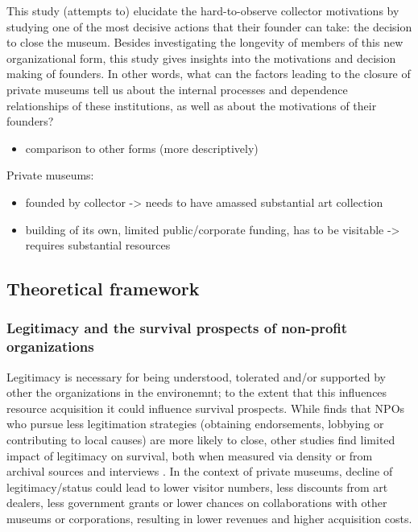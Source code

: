 \documentclass[11pt]{article}
\begin{document}
This study (attempts to) elucidate the hard-to-observe collector motivations by studying one of the most decisive actions that their founder can take: the decision to close the museum.
Besides investigating the longevity of members of this new organizational form, this study gives insights into the motivations and decision making of founders.
In other words, what can the factors leading to the closure of private museums tell us about the internal processes and dependence relationships of these institutions, as well as about the motivations of their founders?


\begin{itemize}
\item comparison to other forms (more descriptively)
\end{itemize}


\bigbreak
\noindent
Private museums:
\begin{itemize}
\item founded by collector -> needs to have amassed substantial art collection
\item building of its own, limited public/corporate funding, has to be visitable -> requires substantial resources
\end{itemize}


\subsection*{Theoretical framework}



\subsubsection*{Legitimacy and the survival prospects of non-profit organizations}

Legitimacy is necessary for being understood, tolerated and/or supported by other the organizations in the environemnt; to the extent that this influences resource acquisition it could influence survival prospects.
While \textcite{Bielefeld_1994_survival} finds that NPOs who pursue less legitimation strategies (obtaining endorsements, lobbying or contributing to local causes) are more likely to close, other studies find limited impact of legitimacy on survival, both when measured via density \parencite{Bogaert_etal_2014_ecological} or from archival sources and interviews \parencite{Fernandez_2007_dissolution}.
In the context of private museums, decline of legitimacy/status could lead to lower visitor numbers, less discounts from art dealers, less government grants or lower chances on collaborations with other museums or corporations, resulting in lower revenues and higher acquisition costs.
\end{document}
